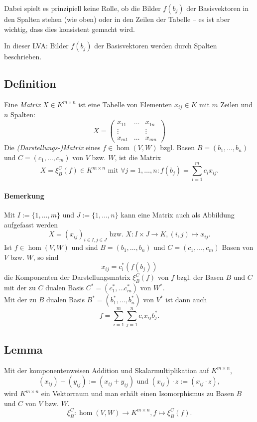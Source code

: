 	Dabei spielt es prinzipiell keine Rolle, ob die Bilder $ f(b_j) $ der Basisvektoren in den Spalten stehen (wie oben) oder in den Zeilen der Tabelle -- es ist aber wichtig, dass dies konsistent gemacht wird.
	
	In dieser LVA: Bilder $ f(b_j) $ der Basisvektoren werden durch Spalten beschrieben.

\subsection{Definition}
	\begin{Definition}[Matrix]
		Eine \emph{Matrix} $ X\in K^{m\times n} $ ist eine Tabelle von Elementen $ x_{ij}\in K $ mit $ m $ Zeilen und $ n $ Spalten:
			\[ X = \begin{pmatrix}
			x_{11} 		& \dots 	& x_{1n}\\
			\vdots 		& 			& \vdots\\
			x_{m1} 		& \dots		& x_{mn}
			\end{pmatrix} \]
		Die \emph{(Darstellungs-)Matrix} eines $ f\in \hom(V,W) $ bzgl. Basen $ B= (b_1,\dots,b_n) $ und $ C=(c_1,\dots,c_m) $ von $ V $ bzw. $ W $, ist die Matrix
			\[ X = \xi^C_B(f)\in K^{m\times n}\text{ mit }\forall j=1,\dots,n:f(b_j) = \sum_{i=1}^{m}c_ix_{ij}. \]
	\end{Definition}
	
\paragraph{Bemerkung}
	Mit $ I:= \{1,\dots,m\} $ und $ J:= \{1,\dots,n\} $ kann eine Matrix auch als Abbildung aufgefasst werden
		\[ X = (x_{ij})_{i\in I,j\in J}\text{ bzw. }X:I\times J\to K,(i,j)\mapsto x_{ij}. \]
	Ist $ f\in \hom(V,W) $ und sind $ B=(b_1,\dots,b_n) $ und $ C=(c_1,\dots,c_m) $ Basen von $ V $ bzw. $ W $, so sind
		\[ x_{ij} = c_i^*(f(b_j)) \]
	die Komponenten der Darstellungsmatrix $ \xi_B^C(f) $ von $ f $ bzgl. der Basen $ B $ und $ C $ mit der zu $ C $ dualen Basis $ C^*=(c_1^*,\dots c_m^*) $ von $ W^* $.\\
	Mit der zu $ B $ dualen Basis $ B^*= (b_1^*,\dots,b_n^*) $ von $ V^* $ ist dann auch
		\[ f=\sum_{i=1}^{m}\sum_{j=1}^{n} c_ix_{ij}b_j^*. \]
\subsection{Lemma}
	\begin{Lemma}
	Mit der komponentenweisen Addition und Skalarmultiplikation auf $ K^{m\times n} $,
		\[ (x_{ij})+(y_{ij}) := (x_{ij}+y_{ij}) \text{ und } (x_{ij})\cdot z := (x_{ij}\cdot z), \]
	wird $ K^{m\times n} $ ein Vektorraum und man erhält einen Isomorphismus zu Basen $B$ und $C$ von $V$ bzw. $W$.
		\[ \xi_B^C:\hom(V,W)\to K^{m\times n},f\mapsto \xi_B^C(f). \]
	\end{Lemma}
